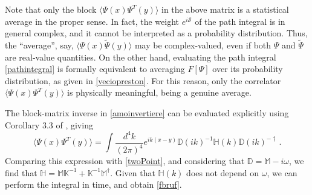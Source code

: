 \documentclass[a4paper, amsfonts, amssymb, amsmath, reprint, showkeys, nofootinbib, twoside,notitlepage,onecolumn]{revtex4-2}
\newcommand{\Da}{{\mathbb{D}}}
\newcommand{\Ma}{{\mathbb{M}}}
\newcommand{\Ka}{{\mathbb{K}}}
\newcommand{\Ha}{{\mathbb{H}}}
\theoremstyle{definition}
\begin{document}
Note that only the block $\langle \Psi(x)\Psi^T(y) \rangle$ in the above matrix is a statistical average in the proper sense. In fact, the weight $e^{i\mathcal{S}}$ of the path integral is in general complex, and it cannot be interpreted as a probability distribution. Thus, the ``average'', say, $\langle \Psi(x)\tilde{\Psi}(y)\rangle$ may be complex-valued, even if both $\Psi$ and $\tilde{\Psi}$ are real-value quantities. On the other hand, evaluating the path integral \eqref{pathintegral} is formally equivalent to averaging $F[\Psi]$ over its probability distribution, as given in \eqref{veciopreston}. For this reason, only the correlator $\langle \Psi(x)\Psi^T(y) \rangle$ is physically meaningful, being a genuine average. 

The block-matrix inverse in \eqref{amoinvertiere} can be evaluated explicitly using Corollary 3.3 of \cite{Lu2002}, giving
\begin{equation}
   \langle \Psi(x)\Psi^T(y) \rangle =  \int \dfrac{d^4 k}{(2\pi)^4} e^{ik(x-y)} \Da(ik)^{-1} \Ha(k) \Da(ik)^{-\dagger} \, .
\end{equation}
Comparing this expression with \eqref{twoPoint}, and considering that $\Da=\Ma-i\omega$, we find that $\Ha {=} \Ma \Ka^{-1}{+}\Ka^{-1}\Ma^\dagger$. Given that $\Ha(k)$ does not depend on $\omega$, we can perform the integral in time, and obtain \eqref{fbruf}.

\end{document}
